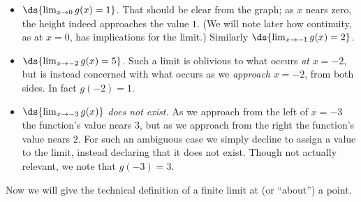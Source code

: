 \begin{itemize}
\item $\ds{\lim_{x\to 0}g(x)=1}$.  That should be clear
from the graph; as $x$ nears zero, the height indeed
approaches the value $1$.   (We will note later how 
continuity, as at $x=0$, has implications for the
limit.) Similarly $\ds{\lim_{x\to-1}g(x)=2}$.
\item $\ds{\lim_{x\to-2}g(x)=5}$.  Such a limit is oblivious
to what occurs {\it at} $x=-2$, but is instead concerned with what occurs
as we {\it approach} $x=-2$, from both sides. In fact $g(-2)=1$.
\item $\ds{\lim_{x\to-3}g(x)}$ {\it does not exist. }As we
approach from the left of $x=-3$ the function's value nears $3$,
but as we approach from the right the function's value
nears $2$.  For such an ambiguous case we simply
decline to assign a value to the limit, instead declaring 
that it does not exist.  Though not actually 
relevant, we note that $g(-3)=3$. 

\end{itemize}

Now we will give the technical definition of a finite
limit at (or ``about'') a point.


